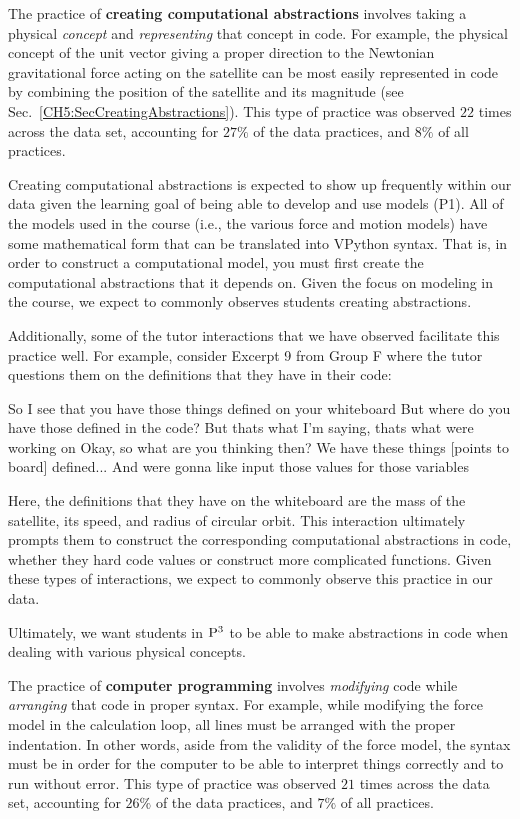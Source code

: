 \documentclass{msuphddissertation}
\begin{document}
\begin{doublespace}
%
%
%

The practice of \textbf{creating computational abstractions} involves taking a physical \textit{concept} and \textit{representing} that concept in code.  For example, the physical concept of the unit vector giving a proper direction to the Newtonian gravitational force acting on the satellite can be most easily represented in code by combining the position of the satellite and its magnitude (see Sec.~\ref{CH5:SecCreatingAbstractions}).  This type of practice was observed $22$ times across the data set, accounting for $27\%$ of the data practices, and $8\%$ of all practices.

Creating computational abstractions is expected to show up frequently within our data given the learning goal of being able to develop and use models (P1).  All of the models used in the course (i.e., the various force and motion models) have some mathematical form that can be translated into VPython syntax.  That is, in order to construct a computational model, you must first create the computational abstractions that it depends on.  Given the focus on modeling in the course, we expect to commonly observes students creating abstractions.

Additionally, some of the tutor interactions that we have observed facilitate this practice well.  For example, consider Excerpt 9 from Group F where the tutor questions them on the definitions that they have in their code: \begin{description}
\TA So I see that you have those things defined on your whiteboard
\TA But where do you have those defined in the code?
\SA But thats what I'm saying, thats what were working on
\TA Okay, so what are you thinking then?
\SA We have these things [points to board] defined...
\SA And were gonna like input those values for those {variables}
\end{description}  Here, the definitions that they have on the whiteboard are the mass of the satellite, its speed, and radius of circular orbit.  This interaction ultimately prompts them to construct the corresponding computational abstractions in code, whether they hard code values or construct more complicated functions.  Given these types of interactions, we expect to commonly observe this practice in our data.

Ultimately, we want students in ${\rm P}^{3}$ to be able to make abstractions in code when dealing with various physical concepts.

%
%
%

The practice of \textbf{computer programming} involves \textit{modifying} code while \textit{arranging} that code in proper syntax.  For example, while modifying the force model in the calculation loop, all lines must be arranged with the proper indentation.  In other words, aside from the validity of the force model, the syntax must be in order for the computer to be able to interpret things correctly and to run without error.  This type of practice was observed $21$ times across the data set, accounting for $26\%$ of the data practices, and $7\%$ of all practices.


\end{doublespace}
\end{document}
